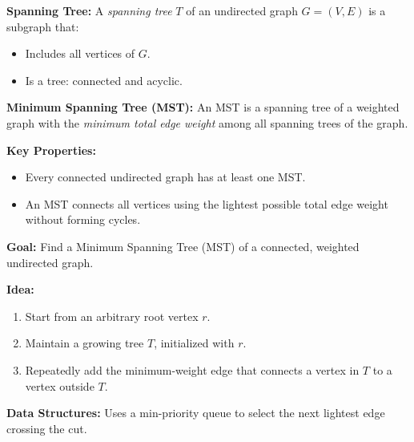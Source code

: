 \documentclass[a4paper,landscape]{article}
\begin{document}
\begin{multicols}{7}
\tcolorbox[mybox={Spanning Trees}]
\textbf{Spanning Tree:}  
A \emph{spanning tree} $T$ of an undirected graph $G = (V, E)$ is a subgraph that:
\begin{itemize}[noitemsep, topsep=0pt]
    \item Includes all vertices of $G$.
    \item Is a tree: connected and acyclic.
\end{itemize}

\textbf{Minimum Spanning Tree (MST):}  
An MST is a spanning tree of a weighted graph with the \emph{minimum total edge weight} among all spanning trees of the graph.

\textbf{Key Properties:}
\begin{itemize}[noitemsep, topsep=0pt]
    \item Every connected undirected graph has at least one MST.
    \item An MST connects all vertices using the lightest possible total edge weight without forming cycles.
\end{itemize}
\endtcolorbox
\tcolorbox[mybox={Prim’s Algorithm}]
\textbf{Goal:} Find a Minimum Spanning Tree (MST) of a connected, weighted undirected graph.

\textbf{Idea:}
\begin{enumerate}[noitemsep, topsep=0pt]
    \item Start from an arbitrary root vertex $r$.
    \item Maintain a growing tree $T$, initialized with $r$.
    \item Repeatedly add the minimum-weight edge that connects a vertex in $T$ to a vertex outside $T$.
\end{enumerate}

\textbf{Data Structures:}
Uses a min-priority queue to select the next lightest edge crossing the cut.

\noindent %


\end{multicols}
\end{document}
